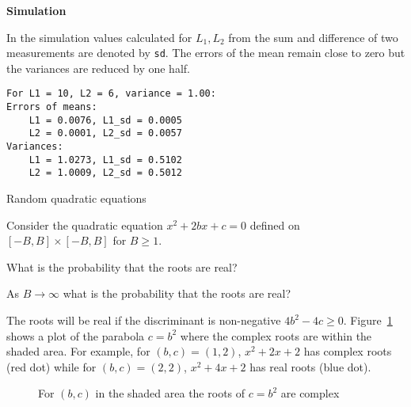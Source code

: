 \textbf{Simulation}

In the simulation values calculated for $L_1,L_2$ from the sum and difference of two measurements are denoted by \texttt{sd}. The errors of the mean remain close to zero but the variances are reduced by one half.

\begin{verbatim}
For L1 = 10, L2 = 6, variance = 1.00:
Errors of means:
    L1 = 0.0076, L1_sd = 0.0005
    L2 = 0.0001, L2_sd = 0.0057
Variances:
    L1 = 1.0273, L1_sd = 0.5102
    L2 = 1.0009, L2_sd = 0.5012
\end{verbatim}


\begin{prob}{Random quadratic equations}

Consider the quadratic equation $x^2+2bx+c=0$ defined on $[-B,B]\times[-B,B]$ for $B\geq 1$.

 What is the probability that the roots are real?

 As $B\rightarrow \infty$ what is the probability that the roots are real?
\end{prob}

\solution{}

The roots will be real if the discriminant is non-negative $4b^2-4c\geq 0$. Figure~\ref{f.real-roots} shows a plot of the parabola $c=b^2$ where the complex roots are within the shaded area. For example, for $(b,c)=(1,2)$, $x^2+2x+2$ has complex roots (red dot) while for $(b,c)=(2,2)$, $x^2+4x+2$ has real roots (blue dot).

\begin{figure}[tb]
\begin{center}
\end{center}
\caption{For $(b,c)$ in the shaded area the roots of $c=b^2$ are complex}\label{f.real-roots}
\end{figure}

